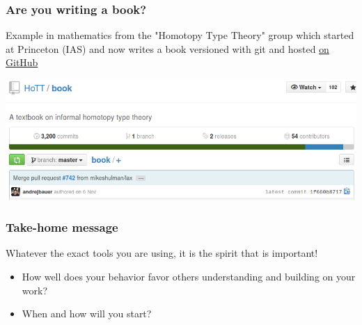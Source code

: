 \documentclass[c]{beamer} %
\begin{document}
\begin{frame}
  \frametitle{Are you writing a book?}
  Example in \alert{mathematics} from the "Homotopy Type Theory" group which started at Princeton (IAS) and now writes a book versioned with git and hosted \href{https://github.com/HoTT/book}{on GitHub}
  
  \bigskip
  
  \begin{center}
    \includegraphics[width=\textwidth,height=\textheight,keepaspectratio=true]{HoTT_book}%
  \end{center}
\end{frame}

\begin{frame}
  \frametitle{Take-home message}
  Whatever the exact tools you are using, it is the spirit that is important!
  
  \bigskip
  \pause
  
  \begin{itemize}
  \item How well does your behavior favor others understanding and building on your work?
    \bigskip
  \item When and how will you start?
  \end{itemize}
\end{frame}
\end{document}
